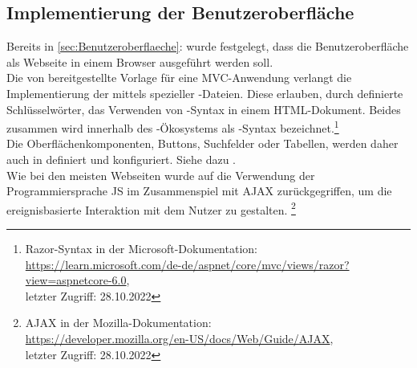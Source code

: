 \subsection{Implementierung der Benutzeroberfläche}
\label{sec:ImplementierungBenutzeroberflaeche}
Bereits in \ref{sec:Benutzeroberflaeche}:  wurde festgelegt, dass die Benutzeroberfläche
als Webseite in einem Browser ausgeführt werden soll.\\
Die von  bereitgestellte Vorlage für eine \acs{MVC}-Anwendung verlangt
die Implementierung der  mittels spezieller -Dateien.
Diese erlauben, durch definierte Schlüsselwörter, das Verwenden von -Syntax in einem
\acs{HTML}-Dokument. Beides zusammen wird innerhalb des -Ökosystems als -Syntax
bezeichnet.\footnote{Razor-Syntax in der Microsoft-Dokumentation:\\
\url{https://learn.microsoft.com/de-de/aspnet/core/mvc/views/razor?view=aspnetcore-6.0}, \\
letzter Zugriff: 28.10.2022}\\ 
Die Oberflächenkomponenten, \zB Buttons, Suchfelder oder Tabellen, werden daher auch in  
definiert und konfiguriert. Siehe dazu .\\
Wie bei den meisten Webseiten wurde auf die Verwendung der Programmiersprache \acs{JS} im Zusammenspiel mit \acs{AJAX} 
zurückgegriffen, um die ereignisbasierte Interaktion mit dem Nutzer zu gestalten.
\footnote{AJAX in der Mozilla-Dokumentation:\\
\url{https://developer.mozilla.org/en-US/docs/Web/Guide/AJAX},\\
letzter Zugriff: 28.10.2022}
\clearpage